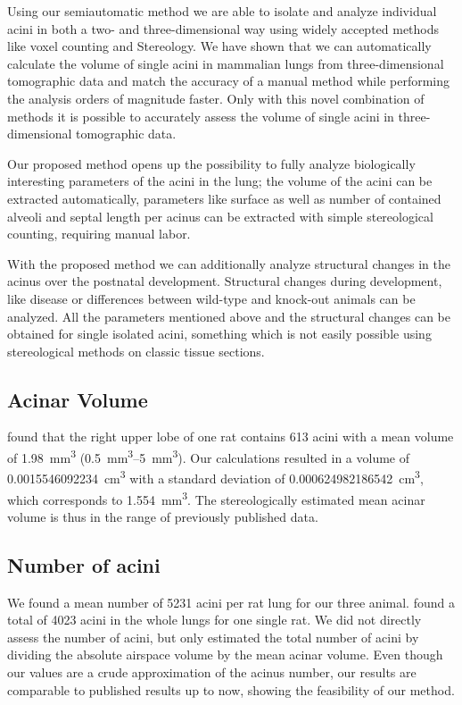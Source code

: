 \documentclass[twoside,paper=a4,abstract=true,english,DIV=calc]{scrartcl}
\newcommand{\meantotalnumberofacini}{5231}
\newcommand{\meanacinarvolume}{0.0015546092234} %
\newcommand{\std}{0.000624982186542} %
\begin{document}
Using our semiautomatic method we are able to isolate and analyze individual acini in both a two- and three-dimensional way using widely accepted methods like voxel counting and Stereology. We have shown that we can automatically calculate the volume of single acini in mammalian lungs from three-dimensional tomographic data and match the accuracy of a manual method while performing the analysis orders of magnitude faster. Only with this novel combination of methods it is possible to accurately assess the volume of single acini in three-dimensional tomographic data.

Our proposed method opens up the possibility to fully analyze biologically interesting parameters of the acini in the lung; the volume of the acini can be extracted automatically, parameters like surface as well as number of contained alveoli and septal length per acinus can be extracted with simple stereological counting, requiring manual labor.

With the proposed method we can additionally analyze structural changes in the acinus over the postnatal development. Structural changes during development, like disease or differences between wild-type and knock-out animals can be analyzed. All the parameters mentioned above and the structural changes can be obtained for single isolated acini, something which is not easily possible using stereological methods on classic tissue sections.

\subsection{Acinar Volume}
\citet[Table 1]{Rodriguez1987} found that the right upper lobe of one rat contains 613 acini with a mean volume of \SI{1.98}{\milli\meter\cubed} (\SIrange{0.5}{5}{\milli\meter\cubed}). Our calculations resulted in a volume of \SI{\meanacinarvolume}{\cubic\centi\meter} with a standard deviation of \SI{\std}{\cubic\centi\meter}, which corresponds to \SI{1.554}{\cubic\milli\meter}. The stereologically estimated mean acinar volume is thus in the range of previously published data.

\subsection{Number of acini}
We found a mean number of \meantotalnumberofacini\xspace acini per rat lung for our three animal. \citet[page 146]{Rodriguez1987} found a total of 4023 acini in the whole lungs for one single rat. We did not directly assess the number of acini, but only estimated the total number of acini by dividing the absolute airspace volume \cite{Tschanz2003} by the mean acinar volume. Even though our values are a crude approximation of the acinus number, our results are comparable to published results up to now, showing the feasibility of our method.
\end{document}
